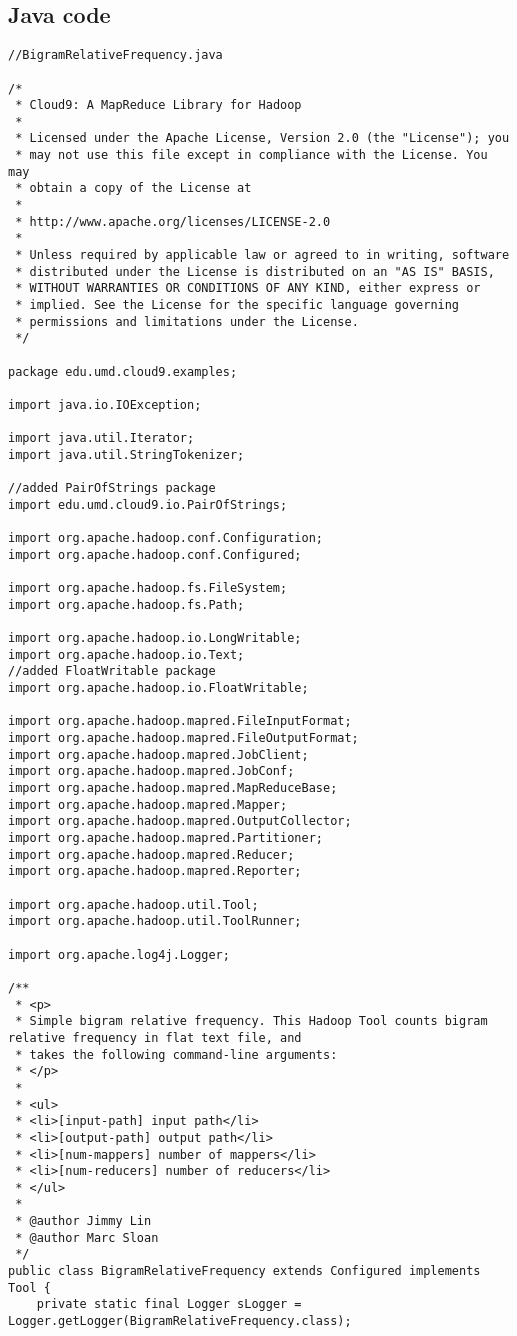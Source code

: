 \documentclass{article} %
\begin{document}
\subsection*{Java code} 

\begin{lstlisting}[style=Java]
//BigramRelativeFrequency.java

/*
 * Cloud9: A MapReduce Library for Hadoop
 * 
 * Licensed under the Apache License, Version 2.0 (the "License"); you
 * may not use this file except in compliance with the License. You may
 * obtain a copy of the License at
 *
 * http://www.apache.org/licenses/LICENSE-2.0 
 *
 * Unless required by applicable law or agreed to in writing, software
 * distributed under the License is distributed on an "AS IS" BASIS,
 * WITHOUT WARRANTIES OR CONDITIONS OF ANY KIND, either express or
 * implied. See the License for the specific language governing
 * permissions and limitations under the License.
 */

package edu.umd.cloud9.examples;

import java.io.IOException;

import java.util.Iterator;
import java.util.StringTokenizer;

//added PairOfStrings package
import edu.umd.cloud9.io.PairOfStrings;

import org.apache.hadoop.conf.Configuration;
import org.apache.hadoop.conf.Configured;

import org.apache.hadoop.fs.FileSystem;
import org.apache.hadoop.fs.Path;

import org.apache.hadoop.io.LongWritable;
import org.apache.hadoop.io.Text;
//added FloatWritable package
import org.apache.hadoop.io.FloatWritable;

import org.apache.hadoop.mapred.FileInputFormat;
import org.apache.hadoop.mapred.FileOutputFormat;
import org.apache.hadoop.mapred.JobClient;
import org.apache.hadoop.mapred.JobConf;
import org.apache.hadoop.mapred.MapReduceBase;
import org.apache.hadoop.mapred.Mapper;
import org.apache.hadoop.mapred.OutputCollector;
import org.apache.hadoop.mapred.Partitioner;
import org.apache.hadoop.mapred.Reducer;
import org.apache.hadoop.mapred.Reporter;

import org.apache.hadoop.util.Tool;
import org.apache.hadoop.util.ToolRunner;

import org.apache.log4j.Logger;

/**
 * <p>
 * Simple bigram relative frequency. This Hadoop Tool counts bigram relative frequency in flat text file, and
 * takes the following command-line arguments:
 * </p>
 * 
 * <ul>
 * <li>[input-path] input path</li>
 * <li>[output-path] output path</li>
 * <li>[num-mappers] number of mappers</li>
 * <li>[num-reducers] number of reducers</li>
 * </ul>
 * 
 * @author Jimmy Lin
 * @author Marc Sloan
 */
public class BigramRelativeFrequency extends Configured implements Tool {
	private static final Logger sLogger = Logger.getLogger(BigramRelativeFrequency.class);


\end{lstlisting}
\end{document}
